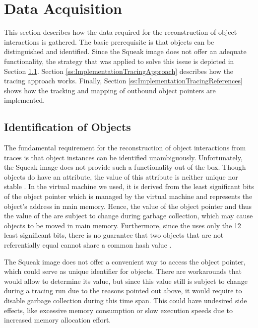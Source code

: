\section{Data Acquisition}
\label{s:ImplementationTracing}
This section describes how the data required for the reconstruction of object interactions is gathered.
The basic prerequisite is that objects can be distinguished and identified.
Since the Squeak image does not offer an adequate functionality, the strategy that was applied to solve this issue is depicted in Section \ref{ss:ImplementationTracingIdentification}.
Section \ref{ss:ImplementationTracingApproach} describes how the tracing approach works.
Finally, Section \ref{ss:ImplementationTracingReferences} shows how the tracking and mapping of outbound object pointers are implemented.

\subsection{Identification of Objects}
\label{ss:ImplementationTracingIdentification}
The fundamental requirement for the reconstruction of object interactions from traces is that object instances can be identified unambiguously.
Unfortunately, the Squeak image does not provide such a functionality out of the box.
Though objects do have an  attribute, the value of this attribute is neither unique nor stable \cite{goldberg_smalltalk-80:_1983}.
In the virtual machine we used, it is derived from the least significant bits of the object pointer which is managed by the virtual machine and represents the object's address in main memory.
Hence, the value of the object pointer and thus the value of the  are subject to change during garbage collection, which may cause objects to be moved in main memory.
Furthermore, since the  uses only the 12 least significant bits, there is no guarantee that two objects that are not referentially equal cannot share a common hash value \cite{goldberg_smalltalk-80:_1983}.

The Squeak image does not offer a convenient way to access the object pointer, which could serve as unique identifier for objects.
There are workarounds that would allow to determine its value, but since this value still is subject to change during a tracing run due to the reasons pointed out above, it would require to disable garbage collection during this time span.
This could have undesired side effects, like excessive memory consumption or slow execution speeds due to increased memory allocation effort.

